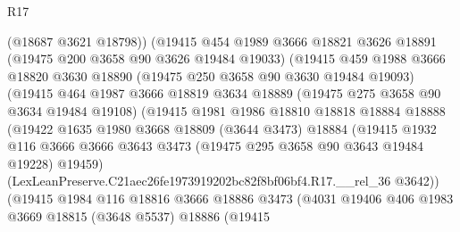 \begin{lexlean}{R17}
\begin{coremodule}
                        (@18687 @3621 @18798))
                      (@19415
                        @454
                        @1989
                        @3666
                        @18821
                        @3626
                        @18891
                        (@19475 @200 @3658 @90 @3626 @19484 @19033)
                        (@19415
                          @459
                          @1988
                          @3666
                          @18820
                          @3630
                          @18890
                          (@19475 @250 @3658 @90 @3630 @19484 @19093)
                          (@19415
                            @464
                            @1987
                            @3666
                            @18819
                            @3634
                            @18889
                            (@19475 @275 @3658 @90 @3634 @19484 @19108)
                            (@19415
                              @1981
                              @1986
                              @18810
                              @18818
                              @18884
                              @18888
                              (@19422
                                @1635
                                @1980
                                @3668
                                @18809
                                (@3644 @3473)
                                @18884
                                (@19415
                                  @1932
                                  @116
                                  @3666
                                  @3666
                                  @3643
                                  @3473
                                  (@19475 @295 @3658 @90 @3643 @19484 @19228)
                                  @19459)
                                (LexLeanPreserve.C21aec26fe1973919202bc82f8bf06bf4.R17.__rel_36
                                  @3642))
                              (@19415
                                @1984
                                @116
                                @18816
                                @3666
                                @18886
                                @3473
                                (@4031
                                  @19406
                                  @406
                                  @1983
                                  @3669
                                  @18815
                                  (@3648 @5537)
                                  @18886
                                  (@19415

\end{coremodule}
\end{lexlean}
